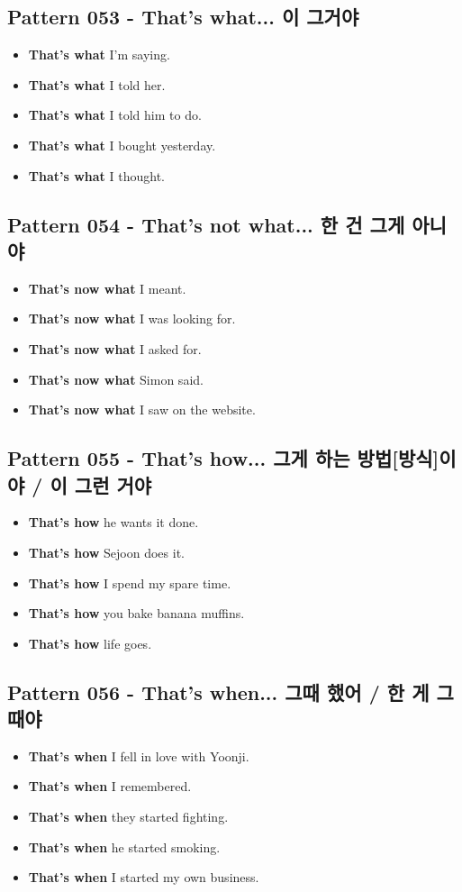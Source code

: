 \documentclass[11pt]{oblivoir}
\begin{document}
\subsection{Pattern 053 - That's what... \texttildelow 이 그거야}
\begin{itemize}
  \item \textbf{That's what} I'm saying.
  \item \textbf{That's what} I told her.
  \item \textbf{That's what} I told him to do.
  \item \textbf{That's what} I bought yesterday.
  \item \textbf{That's what} I thought.
\end{itemize}

\subsection{Pattern 054 - That's not what... \texttildelow 한 건 그게 아니야}
\begin{itemize}
  \item \textbf{That's now what} I meant.
  \item \textbf{That's now what} I was looking for.
  \item \textbf{That's now what} I asked for.
  \item \textbf{That's now what} Simon said.
  \item \textbf{That's now what} I saw on the website.
\end{itemize}

\subsection{Pattern 055 - That's how... 그게 \texttildelow 하는 방법[방식]이야 / \texttildelow 이 그런 거야}
\begin{itemize}
  \item \textbf{That's how} he wants it done.
  \item \textbf{That's how} Sejoon does it.
  \item \textbf{That's how} I spend my spare time.
  \item \textbf{That's how} you bake banana muffins.
  \item \textbf{That's how} life goes.
\end{itemize}

\subsection{Pattern 056 - That's when... 그때 \texttildelow 했어 / \texttildelow 한 게 그때야}
\begin{itemize}
  \item \textbf{That's when} I fell in love with Yoonji.
  \item \textbf{That's when} I remembered.
  \item \textbf{That's when} they started fighting.
  \item \textbf{That's when} he started smoking.
  \item \textbf{That's when} I started my own business.
\end{itemize}
\end{document}

